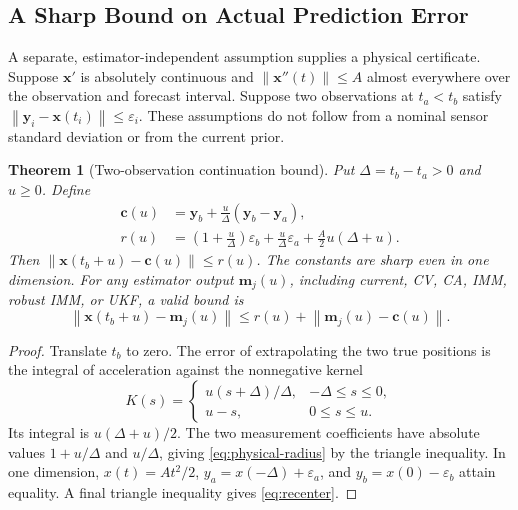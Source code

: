 \documentclass[journal]{IEEEtran}
\newtheorem{theorem}{Theorem}
\newcommand{\norm}[1]{\left\lVert#1\right\rVert}
\begin{document}
\subsection{A Sharp Bound on Actual Prediction Error}

A separate, estimator-independent assumption supplies a physical
certificate. Suppose $\bm x'$ is absolutely continuous and
$\norm{\bm x''(t)}\leq A$ almost everywhere over the observation and
forecast interval. Suppose two observations at $t_a<t_b$ satisfy
$\norm{\bm y_i-\bm x(t_i)}\leq\varepsilon_i$. These assumptions do not
follow from a nominal sensor standard deviation or from the current prior.

\begin{theorem}[Two-observation continuation bound]
\label{thm:physical}
Put $\Delta=t_b-t_a>0$ and $u\geq0$. Define
\begin{align}
 \bm c(u)&=\bm y_b+\frac{u}{\Delta}(\bm y_b-\bm y_a),\\
 r(u)&=\left(1+\frac{u}{\Delta}\right)\varepsilon_b
       +\frac{u}{\Delta}\varepsilon_a+\frac A2u(\Delta+u).
 \label{eq:physical-radius}
\end{align}
Then $\norm{\bm x(t_b+u)-\bm c(u)}\leq r(u)$.
The constants are sharp even in one dimension.
For any estimator output $\bm m_j(u)$, including current, CV, CA, IMM,
robust IMM, or UKF, a valid bound is
\begin{equation}
 \norm{\bm x(t_b+u)-\bm m_j(u)}
 \leq r(u)+\norm{\bm m_j(u)-\bm c(u)}.
 \label{eq:recenter}
\end{equation}
\end{theorem}
\begin{proof}
Translate $t_b$ to zero. The error of extrapolating the two true positions
is the integral of acceleration against the nonnegative kernel
\begin{equation*}
 K(s)=\begin{cases}u(s+\Delta)/\Delta,&-\Delta\leq s\leq0,\\
 u-s,&0\leq s\leq u.\end{cases}
\end{equation*}
Its integral is $u(\Delta+u)/2$. The two measurement coefficients have
absolute values $1+u/\Delta$ and $u/\Delta$, giving
\eqref{eq:physical-radius} by the triangle inequality. In one dimension,
$x(t)=At^2/2$, $y_a=x(-\Delta)+\varepsilon_a$, and
$y_b=x(0)-\varepsilon_b$ attain equality. A final triangle inequality
gives \eqref{eq:recenter}.
\end{proof}
\end{document}

